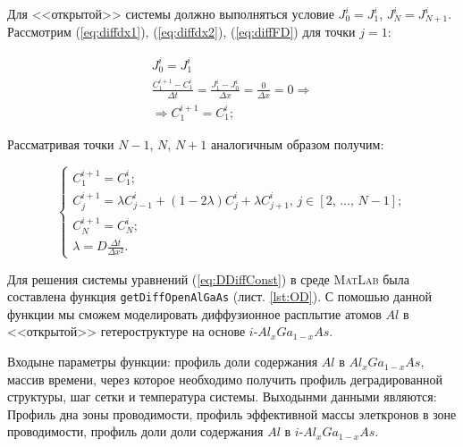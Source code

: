 Для <<открытой>> системы должно выполняться условие $J_{0}^{i} = J_{1}^{i}$, $J_{N}^{i} = J_{N+1}^{i}$. Рассмотрим (\ref{eq:diffdx1}), (\ref{eq:diffdx2}), (\ref{eq:diffFD}) для точки $j = 1$:

\begin{gather*}
 	J^{i}_{0} = J^{i}_{1}\\
	\frac{C^{i+1}_{1} - C^{i}_{1}}{\Delta t} = \frac{J^{i}_{1} - J^{i}_{0}}{\Delta x} = \frac{0}{\Delta x} = 0\Rightarrow\\
	\Rightarrow C^{i+1}_{1} = C^{i}_{1};
\end{gather*}

Рассматривая точки $N-1$, $N$, $N+1$ аналогичным образом получим:

\begin{equation}
	\label{eq:DDiffConst}
	\begin{cases}
		C^{i+1}_{1} = C^{i}_{1};\\
		C^{i+1}_{j} = \lambda C^{i}_{j-1} + (1 - 2\lambda)C^{i}_{j} + \lambda C^{i}_{j+1},\,j \in [2,\,\dots,\,N-1];\\
		C^{i+1}_{N} = C^{i}_{N};\\
		\lambda = D\frac{\Delta t}{\Delta x^{2}}.
	\end{cases}
\end{equation}

Для решения системы уравнений (\ref{eq:DDiffConst}) в среде \textsc{MatLab} была составлена функция \texttt{getDiffOpenAlGaAs} (лист. \ref{lst:OD}). С помошью данной функции мы сможем моделировать диффузионное расплытие атомов $Al$ в <<открытой>> гетероструктуре на основе $i$-$Al_{x}Ga_{1-x}As$.

Входыне параметры функции: профиль доли содержания $Al$ в $Al_{x}Ga_{1-x}As$, массив времени, через которое необходимо получить профиль деградированной структуры, шаг сетки и температура системы. Выходынми данными являются: Профиль дна зоны проводимости, профиль эффективной массы элеткронов в зоне проводимости, профиль доли доли содержания $Al$ в $i$-$Al_{x}Ga_{1-x}As$.


